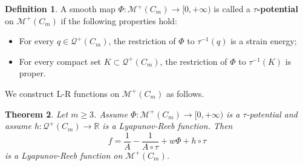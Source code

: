 \documentclass[11pt,letterpaper]{amsart}
\theoremstyle{plain}
\newtheorem{theorem}{Theorem}[section]
\theoremstyle{definition}
\newtheorem{definition}[theorem]{Definition}
\theoremstyle{remark}
\numberwithin{equation}{section}
\begin{document}

\begin{definition}
A smooth map $\Phi:\mathcal M^{+}(C_m)\to [0,+\infty)$ is called a \textbf{$\tau$-potential}
on $\mathcal M^{+}(C_m)$ if the following properties hold:
\begin{itemize}
\item[\textbf{(s1)}] For every $q\in \mathcal Q^{+}(C_m)$, the restriction of $\Phi$ to $\tau^{-1}(q)$ is a strain energy;
\item[\textbf{(s2)}]For every compact set $K\subset \mathcal Q^{+}(C_m)$, the restriction of $\Phi$ to $\tau^{-1}(K)$ is proper.
\end{itemize}
\end{definition}

We construct L-R functions on $\mathcal M^{+}(C_m)$ as follows.
\begin{theorem}\label{T-4-16}
Let $m\geq 3$. Assume $\Phi:\mathcal M^{+}(C_m)\to [0,+\infty)$ is a $\tau$-potential and assume $h:\mathcal Q^{+}(C_m)\to\mathbb R$ is a Lyapunov-Reeb function. Then
\[
f=\frac{1}{A}-\frac{1}{A\circ\tau}+w\Phi+h\circ\tau
\]
is a Lyapunov-Reeb function on $\mathcal M^{+}(C_m)$.
\end{theorem}
\end{document}
